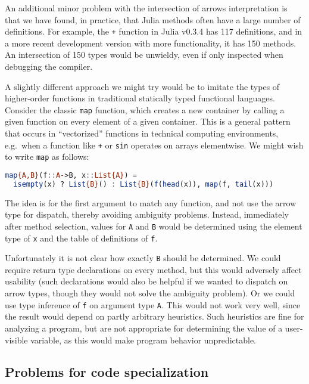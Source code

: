An additional minor problem with the intersection of arrows
interpretation is that we have found, in practice, that Julia methods
often have a large number of definitions.
For example, the \texttt{+} function in Julia v0.3.4 has 117 definitions,
and in a more recent development version with more functionality, it has
150 methods.
An intersection of 150 types would be unwieldy, even if only
inspected when debugging the compiler.

A slightly different approach we might try would be to imitate
the types of higher-order functions in traditional
statically typed functional languages.
Consider the classic \texttt{map} function, which creates a new container
by calling a given function on every element of a given container.
This is a general pattern that occurs in ``vectorized'' functions in
technical computing environments, e.g.\ when a function like \texttt{+}
or \texttt{sin} operates on arrays elementwise.
We might wish to write \texttt{map} as follows:

\begin{singlespace}
\begin{lstlisting}[language=julia]
map{A,B}(f::A->B, x::List{A}) =
  isempty(x) ? List{B}() : List{B}(f(head(x)), map(f, tail(x)))
\end{lstlisting}
\end{singlespace}

The idea is for the first argument to match any function, and not use
the arrow type for dispatch, thereby avoiding ambiguity problems.
Instead, immediately after method selection, values for \texttt{A} and
\texttt{B} would be determined using the element type of \texttt{x}
and the table of definitions of \texttt{f}.

Unfortunately it is not clear how exactly \texttt{B} should be
determined. We could require return type declarations on every method,
but this would adversely affect usability (such declarations would also
be helpful if we wanted to dispatch on arrow types, though they would
not solve the ambiguity problem). Or we could use type inference
of \texttt{f} on argument type \texttt{A}. This would not work very
well, since the result would depend on partly arbitrary heuristics.
Such heuristics are fine for analyzing a program, but
are not appropriate for determining the value of a user-visible
variable, as this would make program behavior unpredictable.

\subsection{Problems for code specialization}


